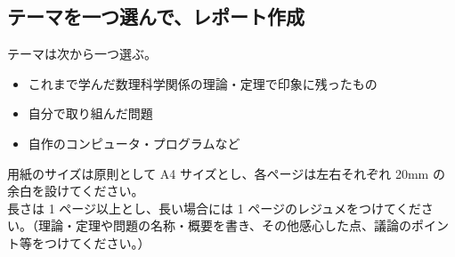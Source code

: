 \documentclass{jsarticle}
\begin{document}
\subsection{テーマを一つ選んで、レポート作成}
テーマは次から一つ選ぶ。
\begin{itemize}
\item これまで学んだ数理科学関係の理論・定理で印象に残ったもの
\item 自分で取り組んだ問題
\item 自作のコンピュータ・プログラムなど
\end{itemize}
用紙のサイズは原則として A4 サイズとし、各ページは左右それぞれ 20mm の余白を設けてください。\\
長さは 1 ページ以上とし、長い場合には 1 ページのレジュメをつけてください。（理論・定理や問題の名称・概要を書き、その他感心した点、議論のポイント等をつけてください。）
\end{document}
